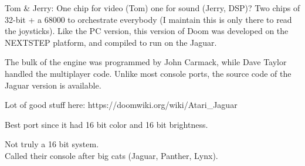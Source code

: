 Tom \& Jerry: One chip for video (Tom) one for sound (Jerry, DSP)? Two chips of 32-bit + a 68000 to orchestrate everybody (I maintain this is only there to read the joysticks).
Like the PC version, this version of Doom was developed on the NEXTSTEP platform, and compiled to run on the Jaguar.\\
\par The bulk of the engine was programmed by John Carmack, while Dave Taylor handled the multiplayer code. Unlike most console ports, the source code of the Jaguar version is available.\\
\par
{}
\par
Lot of good stuff here: https://doomwiki.org/wiki/Atari\_Jaguar\\
\par
Best port since it had 16 bit color and 16 bit brightness.
\par
{}
Not truly a 16 bit system.\\
Called their console after big cats (Jaguar, Panther, Lynx).\\
\par
{}\\
\par
{}
\par
{}

